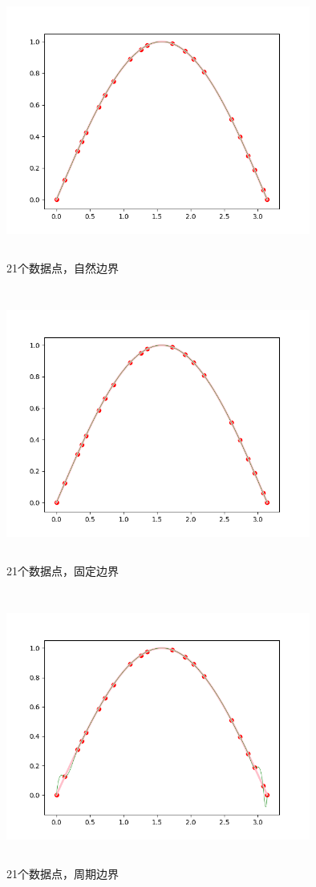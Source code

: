 \documentclass[UTF8]{ctexart}
\begin{document}
\begin{figure}[H]
 \centering
  \includegraphics[width=10cm,height=9cm]{4-0_21.png}
  \caption{21个数据点，自然边界}
\end{figure}
\begin{figure}[H]
 \centering
  \includegraphics[width=10cm,height=9cm]{4-1_21.png}
  \caption{21个数据点，固定边界}
\end{figure}
\begin{figure}[H]
 \centering
  \includegraphics[width=10cm,height=9cm]{4-2_21.png}
  \caption{21个数据点，周期边界}
\end{figure}
\end{document}
